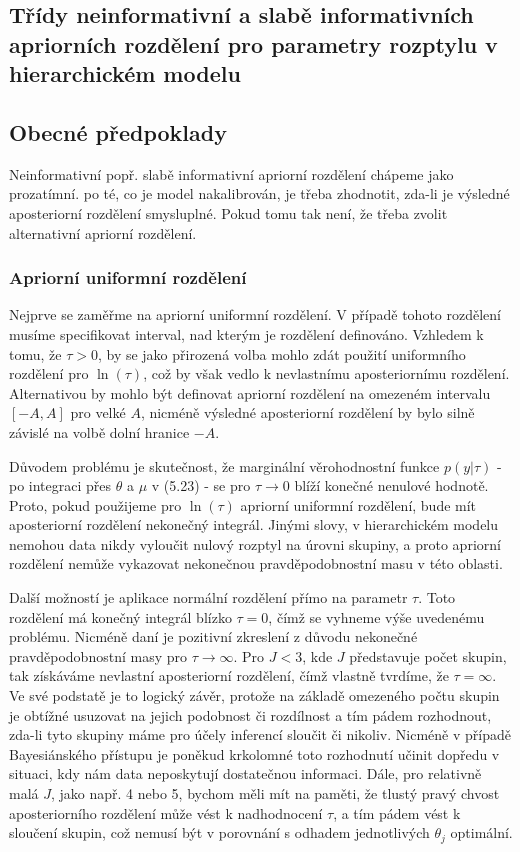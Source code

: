 \subsection{Třídy neinformativní a slabě informativních apriorních rozdělení pro parametry rozptylu v hierarchickém modelu}

\subsection{Obecné předpoklady}

Neinformativní popř. slabě informativní apriorní rozdělení chápeme jako prozatímní. po té, co je model nakalibrován, je třeba zhodnotit, zda-li je výsledné aposteriorní rozdělení smysluplné. Pokud tomu tak není, že třeba zvolit alternativní apriorní rozdělení.

\subsubsection{Apriorní uniformní rozdělení}

Nejprve se zaměřme na apriorní uniformní rozdělení. V případě tohoto rozdělení musíme specifikovat interval, nad kterým je rozdělení definováno. Vzhledem k tomu, že $\tau > 0$, by se jako přirozená volba mohlo zdát použití uniformního rozdělení pro $\ln(\tau)$, což by však vedlo k nevlastnímu aposteriornímu rozdělení. Alternativou by mohlo být definovat apriorní rozdělení na omezeném intervalu $[-A, A]$ pro velké $A$, nicméně výsledné aposteriorní rozdělení by bylo silně závislé na volbě dolní hranice $-A$.

Důvodem problému je skutečnost, že marginální věrohodnostní funkce $p(y|\tau)$ - po integraci přes $\theta$ a $\mu$ v (5.23) - se pro $\tau \rightarrow 0$ blíží konečné nenulové hodnotě. Proto, pokud použijeme pro $\ln(\tau)$ apriorní uniformní rozdělení, bude mít aposteriorní rozdělení nekonečný integrál. Jinými slovy, v hierarchickém modelu nemohou data nikdy vyloučit nulový rozptyl na úrovni skupiny, a proto apriorní rozdělení nemůže vykazovat nekonečnou pravděpodobnostní masu v této oblasti.

Další možností je aplikace normální rozdělení přímo na parametr $\tau$. Toto rozdělení má konečný integrál blízko $\tau = 0$, čímž se vyhneme výše uvedenému problému. Nicméně daní je pozitivní zkreslení z důvodu nekonečné pravděpodobnostní masy pro $\tau \rightarrow \infty$. Pro $J < 3$, kde $J$ představuje počet skupin, tak získáváme nevlastní aposteriorní rozdělení, čímž vlastně tvrdíme, že $\tau = \infty$. Ve své podstatě je to logický závěr, protože na základě omezeného počtu skupin je obtížné usuzovat na jejich podobnost či rozdílnost a tím pádem rozhodnout, zda-li tyto skupiny máme pro účely inferencí sloučit či nikoliv. Nicméně v případě Bayesiánského přístupu je poněkud krkolomné toto rozhodnutí učinit dopředu v situaci, kdy nám data neposkytují dostatečnou informaci. Dále, pro relativně malá $J$, jako např. 4 nebo 5, bychom měli mít na paměti, že tlustý pravý chvost aposteriorního rozdělení může vést k nadhodnocení $\tau$, a tím pádem vést k sloučení skupin, což nemusí být v porovnání s odhadem jednotlivých $\theta_j$ optimální.

